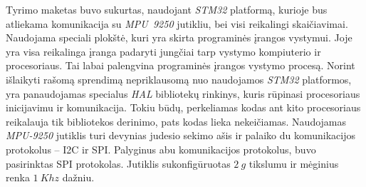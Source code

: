 Tyrimo maketas buvo sukurtas, naudojant \textit{STM32} platformą, kurioje bus atliekama komunikacija su \textit{MPU~9250} jutikliu, bei visi reikalingi skaičiavimai.
Naudojama speciali plokštė, kuri yra skirta programinės įrangos vystymui.
Joje yra visa reikalinga įranga padaryti jungčiai tarp vystymo kompiuterio ir procesoriaus.
Tai labai palengvina programinės įrangos vystymo procesą.
Norint išlaikyti rašomą sprendimą nepriklausomą nuo naudojamos \textit{STM32} platformos, yra panaudojamas specialus \textit{HAL} bibliotekų rinkinys, kuris rūpinasi procesoriaus inicijavimu ir komunikacija.
Tokiu būdų, perkeliamas kodas ant kito procesoriaus reikalauja tik bibliotekos derinimo, pats kodas lieka nekeičiamas.
Naudojamas \textit{MPU-9250} jutiklis turi devynias judesio sekimo ašis ir palaiko du komunikacijos protokolus -- I2C ir SPI.
Palyginus abu komunikacijos protokolus, buvo pasirinktas SPI protokolas.
Jutiklis sukonfigūruotas $2~g$ tikslumu ir mėginius renka $1~Khz$ dažniu.







